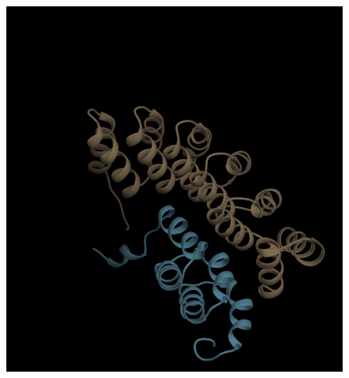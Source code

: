 \documentclass{article}
\begin{document}
\begin{figure}
\begin{minipage}{.50\textwidth}
  \centering
  \includegraphics[width=.9\linewidth]{t53_decoy}
  \label{fig:test2}
\end{minipage}

\end{figure}
\end{document}
